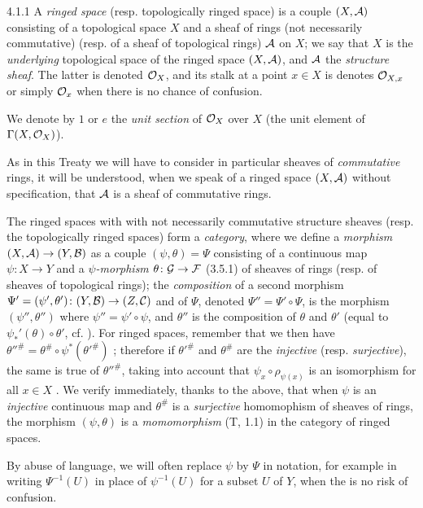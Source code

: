 
\begin{env}{4.1.1}
A \emph{ringed space} (resp. topologically ringed space) is a couple $(X,\mathcal{A})$
consisting of a topological space $X$ and a sheaf of rings (not necessarily commutative)
(resp. of a sheaf of topological rings) $\mathcal{A}$ on $X$; we say that $X$ is the
\emph{underlying} topological space of the ringed space $(X,\mathcal{A})$, and $\mathcal{A}$
the \emph{structure sheaf}. The latter is denoted $\mathcal{O}_X$, and its stalk at a point
$x\in X$ is denotes $\mathcal{O}_{X,x}$ or simply $\mathcal{O}_x$ when there is no chance of confusion.

We denote by $1$ or $e$ the \emph{unit section} of $\mathcal{O}_X$ over $X$ (the unit element
of $\Gamma(X,\mathcal{O}_X)$).

As in this Treaty we will have to consider in particular sheaves of \emph{commutative}
rings, it will be understood, when we speak of a ringed space $(X,\mathcal{A})$ without
specification, that $\mathcal{A}$ is a sheaf of commutative rings.

The ringed spaces with with not necessarily commutative structure sheaves
(resp. the topologically ringed spaces) form a \emph{category}, where we define
a \emph{morphism} $(X,\mathcal{A})\to(Y,\mathcal{B})$ as a couple $(\psi,\theta)=\Psi$
consisting of a continuous map $\psi\colon X\to Y$ and a \emph{$\psi$-morphism}
$\theta\colon\mathcal{G}\to\mathcal{F}$ (3.5.1) of sheaves of rings (resp. of sheaves of
topological rings); the \emph{composition} of a second morphism
$\Psi'=(\psi',\theta')\colon(Y,\mathcal{B})\to(Z,\mathcal{C})$ and of $\Psi$, denoted
$\Psi''=\Psi'\circ\Psi$, is the morphism $(\psi'',\theta'')$ where $\psi''=\psi'\circ\psi$,
and $\theta''$ is the composition of $\theta$ and $\theta'$ (equal to
$\psi_\ast'(\theta)\circ\theta'$, cf. ). For ringed spaces, remember that we
then have ${\theta''}^\#=\theta^\#\circ\psi^\ast({\theta'}^\#)$ ; therefore
if ${\theta'}^\#$ and $\theta^\#$ are the \emph{injective} (resp. \emph{surjective}),
the same is true of ${\theta''}^\#$, taking into account that $\psi_x\circ\rho_{\psi(x)}$
is an isomorphism for all $x\in X$ . We verify immediately, thanks to the
above, that when $\psi$ is an \emph{injective} continuous map and $\theta^\#$ is
a \emph{surjective} homomophism of sheaves of rings, the morphism $(\psi,\theta)$ is
a \emph{momomorphism} (T, 1.1) in the category of ringed spaces.

By abuse of language, we will often replace $\psi$ by $\Psi$ in notation, for
example in writing $\Psi^{-1}(U)$ in place of $\psi^{-1}(U)$ for a subset $U$ of $Y$,
when the is no risk of confusion.
\end{env}

